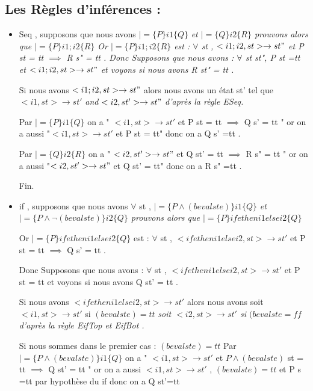 \documentclass{article}
\begin{document}
\subsection{Les Règles d'inférences :}
\begin{itemize}
\item Seq , supposons que nous avons $|= \{P\}i1\{Q\}$ \it{et}  $|= \{Q\}i2\{R\}$ prouvons alors que $|= \{P\}i1;i2\{R\}$ 
Or  $|= \{P\}i1;i2\{R\}$ est : $\forall$ st  , $< i1;i2 ,st > \rightarrow st"$  et P  st = tt $\implies$ R s" = tt . 
Donc
Supposons que nous avons : $\forall$ st st", P st =tt et $<i1;i2 , st> \rightarrow  st" $ et voyons si nous avons R st" = tt .

Si nous avons $<i1;i2 , st> \rightarrow  st" $ alors nous avons un état st' tel que $<i1 ,st > \rightarrow st' $ \it{and} $<i2 ,st' > \rightarrow st" $  d'après la règle E\textunderscore Seq.

Par $|= \{P\}i1\{Q\}$ on a " $< i1,st > \rightarrow st' $  et P  st = tt $\implies$ Q s' = tt "  or on a aussi "$<i1,st> \rightarrow st'$ et P st = tt" donc on a Q s' =tt .

Par $|= \{Q\}i2\{R\}$ on a " $<i2,st' > \rightarrow st" $  et Q  st' = tt $\implies$ R s" = tt " or on a aussi "$<i2,st'> \rightarrow st" $ et Q st' = tt" donc on a R s" =tt .

Fin.

\item if , supposons que nous avons $\forall$ st , $|= \{P \land (beval st e) \}i1\{Q\}$ \it{et}  $|= \{P \land \lnot (beval st e) \}i2\{Q\}$ prouvons alors que $|= \{P\}if e then i1 else i2 \{Q\}$ 

Or $|= \{P\}if e then i1 else i2 \{Q\}$  est : $\forall$ st  , $< if e then i1 else i2 ,st > \rightarrow st' $  et P  st = tt $\implies$ Q s' = tt .

Donc 
Supposons que nous avons : $\forall$ st  , $< if e then i1 else i2 ,st > \rightarrow st' $  et P  st = tt  et voyons si nous avons Q st' = tt .

Si nous avons  $< if e then i1 else i2 ,st > \rightarrow st' $  alors nous avons soit $<i1 ,st > \rightarrow st' $ si $(beval st e) = tt$ \it{soit} $<i2 ,st > \rightarrow st' $  si $(beval st e = ff$ d'après la règle E\textunderscore ifTop et E\textunderscore ifBot .

Si nous sommes dans le premier cas : $(beval st e) = tt$ 
Par $|= \{P \land (beval st e) \}i1\{Q\}$ on a  " $< i1,st > \rightarrow st' $  et $P \land (beval st e)$ st = tt $\implies$ Q st' = tt " or on a aussi $<i1 ,st > \rightarrow st' $ , $(beval st e) = tt$  et P s =tt par  hypothèse du if donc on a Q st'=tt



\end{itemize}
\end{document}
